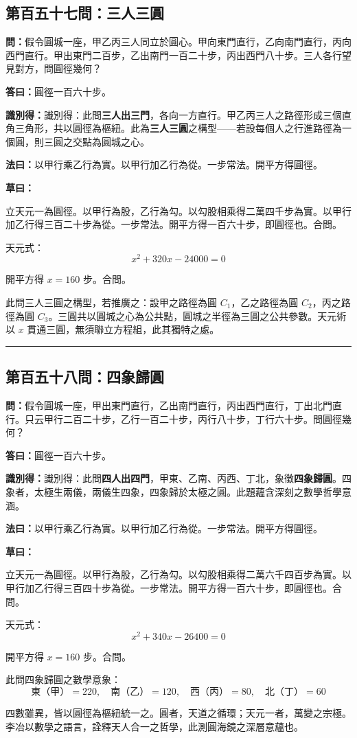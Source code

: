 \documentclass[11pt,a4paper]{article}
\newcommand{\longline}{\noindent\rule{\textwidth}{0.4pt}}
\newcommand{\wen}[1]{\par\noindent\textbf{\textcolor{probcolor}{問：}}{#1}\par}
\newcommand{\da}[1]{\par\noindent\textbf{\textcolor{anscolor}{答曰：}}{#1}\par}
\newcommand{\fayue}[1]{\par\noindent\textbf{\textcolor{methodcolor}{法曰：}}{#1}\par}
\newcommand{\caoyue}[1]{\par\noindent\textbf{草曰：}{#1}\par}
\newcommand{\zhi}[1]{\par\noindent\textbf{識別得：}{#1}\par}
\begin{document}
\subsection*{第百五十七問：三人三圓}
\wen{假令圓城一座，甲乙丙三人同立於圓心。甲向東門直行，乙向南門直行，丙向西門直行。甲出東門二百步，乙出南門一百二十步，丙出西門八十步。三人各行望見對方，問圓徑幾何？}

\da{圓徑一百六十步。}

\zhi{識別得：此問\textbf{三人出三門}，各向一方直行。甲乙丙三人之路徑形成三個直角三角形，共以圓徑為樞紐。此為\textbf{三人三圓}之構型——若設每個人之行進路徑為一個圓，則三圓之交點為圓城之心。}

\fayue{以甲行乘乙行為實。以甲行加乙行為從。一步常法。開平方得圓徑。}

\caoyue{
立天元一為圓徑。以甲行為股，乙行為勾。以勾股相乘得二萬四千步為實。以甲行加乙行得三百二十步為從。一步常法。開平方得一百六十步，即圓徑也。合問。

天元式：
$$x^2 + 320x - 24000 = 0$$

開平方得 $x = 160$ 步。合問。

此問三人三圓之構型，若推廣之：設甲之路徑為圓 $C_1$，乙之路徑為圓 $C_2$，丙之路徑為圓 $C_3$。三圓共以圓城之心為公共點，圓城之半徑為三圓之公共參數。天元術以 $x$ 貫通三圓，無須聯立方程組，此其獨特之處。
}

\vspace{0.5cm}
\longline

\subsection*{第百五十八問：四象歸圓}
\wen{假令圓城一座，甲出東門直行，乙出南門直行，丙出西門直行，丁出北門直行。只云甲行二百二十步，乙行一百二十步，丙行八十步，丁行六十步。問圓徑幾何？}

\da{圓徑一百六十步。}

\zhi{識別得：此問\textbf{四人出四門}，甲東、乙南、丙西、丁北，象徵\textbf{四象歸圓}。四象者，太極生兩儀，兩儀生四象，四象歸於太極之圓。此題蘊含深刻之數學哲學意涵。}

\fayue{以甲行乘乙行為實。以甲行加乙行為從。一步常法。開平方得圓徑。}

\caoyue{
立天元一為圓徑。以甲行為股，乙行為勾。以勾股相乘得二萬六千四百步為實。以甲行加乙行得三百四十步為從。一步常法。開平方得一百六十步，即圓徑也。合問。

天元式：
$$x^2 + 340x - 26400 = 0$$

開平方得 $x = 160$ 步。合問。

此問四象歸圓之數學意象：
$$\text{東（甲）} = 220, \quad \text{南（乙）} = 120, \quad \text{西（丙）} = 80, \quad \text{北（丁）} = 60$$

四數雖異，皆以圓徑為樞紐統一之。圓者，天道之循環；天元一者，萬變之宗極。李冶以數學之語言，詮釋天人合一之哲學，此測圓海鏡之深層意蘊也。
}
\end{document}
